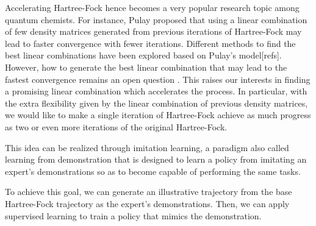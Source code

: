 \documentclass[twoside,11pt]{article}
\begin{document}




Accelerating Hartree-Fock hence becomes a very popular research topic among quantum chemists. For instance, Pulay \cite{Pulay1980} proposed that using a linear combination of few density matrices generated from previous iterations of Hartree-Fock may lead to faster convergence with fewer iterations. Different methods to find the best linear combinations have been explored based on Pulay's model[refs]. However, how to generate the best linear combination that may lead to the fastest convergence remains an open question \cite{Konstantin2002}\cite{Thorsten2011}\cite{Alejandro2012}. This raises our interests in finding a promising linear combination which accelerates the process. In particular, with the extra flexibility given by the linear combination of previous density matrices, we would like to make a single iteration of Hartree-Fock achieve as much progress as two or even more iterations of the original Hartree-Fock.

This idea can be realized through imitation learning, a paradigm also called learning from demonstration that is designed to learn a policy from imitating an expert's demonstrations so as to become capable of performing the same tasks. 

To achieve this goal, we can generate an illustrative trajectory from the base Hartree-Fock trajectory as the expert's demonstrations. Then, we can apply supervised learning to train a policy that mimics the demonstration. 
\end{document}
